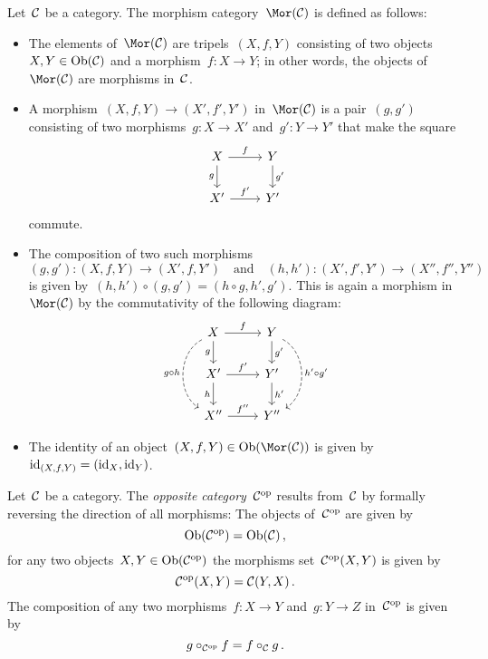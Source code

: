 \begin{example*}
  \label{morphism category}
  Let~$\mathcal{C}$ be a category.
  The morphism category~$\Mor(\Ccat)$ is defined as follows:
  \begin{itemize}
    \item 
      The elements of~$\Mor(\Ccat)$ are tripels~$(X,f,Y)$ consisting of two objects~$X, Y \in \operatorname{Ob}(\mathcal{C})$ and a morphism~$f \colon X \to Y$;
      in other words, the objects of~$\Mor(\Ccat)$ are morphisms in~$\mathcal{C}$.
    \item
      A morphism~$(X, f, Y) \to (X', f', Y')$ in~$\Mor(\Ccat)$ is a pair~$(g, g')$ consisting of two morphisms~$g \colon X \to X'$ and~$g' \colon Y \to Y'$ that make the square
      \[
        \begin{tikzcd}
            X
            \arrow{r}[above]{f}
            \arrow{d}[left]{g}
          & Y
            \arrow{d}[right]{g'}
          \\
            X'
            \arrow{r}[above]{f'}
          & Y'
        \end{tikzcd}
      \]
      commute.
    \item
      The composition of two such morphisms
      \[
                (g,g')
        \colon  (X,f,Y)
        \to     (X',f,Y')
        \quad\text{and}\quad
                (h,h')
        \colon  (X',f',Y')
        \to     (X'',f'',Y'')
      \]
      is given by~$(h,h') \circ (g,g') = (h \circ g, h', g')$.
      This is again a morphism in~$\Mor(\Ccat)$ by the commutativity of the following diagram:
      \[
        \begin{tikzcd}
            X
            \arrow{r}[above]{f}
            \arrow{d}[left]{g}
            \arrow[dashed, bend right = 60]{dd}[left]{g \circ h}
          & Y
            \arrow{d}[right]{g'}
            \arrow[dashed, bend left = 60]{dd}[right]{h' \circ g'}
          \\
            X'
            \arrow{r}[above]{f'}
            \arrow{d}[left]{h}
          & Y'
            \arrow{d}[right]{h'}
          \\
            X''
            \arrow{r}[above]{f''}
          & Y''
        \end{tikzcd}
      \]
    \item
      The identity of an object~$(X,f,Y) \in \Ob(\Mor(\Ccat))$ is given by~$\operatorname{id}_{(X,f,Y)} = (\operatorname{id}_X, \operatorname{id}_Y)$.
  \end{itemize}
\end{example*}


\begin{definition}
  Let~$\mathcal{C}$ be a category.
  The \emph{opposite category}~$\mathcal{C}^{\mathrm{op}}$ results from~$\mathcal{C}$ by formally reversing the direction of all morphisms:
  The objects of~$\mathcal{C}^{\mathrm{op}}$ are given by
  \[
      \operatorname{Ob}(\mathcal{C}^{\mathrm{op}})
    = \operatorname{Ob}(\mathcal{C}) \,,
  \]
  for any two objects~$X, Y \in \operatorname{Ob}(\mathcal{C}^{\mathrm{op}})$ the morphisms set~$\mathcal{C}^{\mathrm{op}}(X,Y)$ is given by
  \[
      \mathcal{C}^{\mathrm{op}}(X,Y)
    = \mathcal{C}(Y,X) \,.
  \]
  The composition of any two morphisms~$f \colon X \to Y$ and~$g \colon Y \to Z$ in~$\mathcal{C}^{\mathrm{op}}$ is given by
  \[
      g \circ_{\mathcal{C}^{\mathrm{op}}} f
    = f \circ_{\mathcal{C}} g \,.
  \]
\end{definition}


